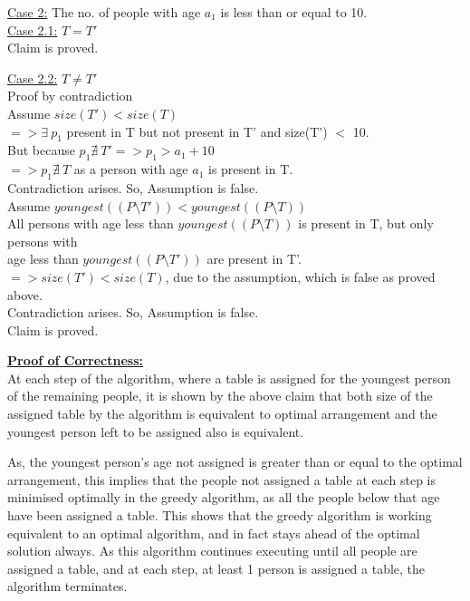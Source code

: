 \documentclass[a4paper]{article}
\begin{document}
\begin{enumerate}[(a)]
    \underline{Case 2:} The no. of people with age $a_1$ is less than or equal to 10.\\
    \phantom{Case 2:} \underline{Case 2.1:} $T = T'$\\
    \phantom{Case 2:Case 2.1:} Claim is proved.
    
    \phantom{Case 2:} \underline{Case 2.2:} $T \not= T'$\\
    \phantom{Case 2:Case 2.1:} Proof by contradiction\\
    
    \phantom{Case 2:Case 2.1:} Assume $size(T') < size(T)$\\
    \phantom{Case 2:Case 2.1:} $=> \exists \ p_1$ present in T but not present in T' and size(T') $<$ 10.\\
    \phantom{Case 2:Case 2.1:} But because $p_1 \nexists \ T' => p_1 > a_1 + 10$\\
    \phantom{Case 2:Case 2.1:} $=> p_1 \nexists \ T$ as a person with age $a_1$ is present in T.\\
    \phantom{Case 2:Case 2.1:} Contradiction arises. So, Assumption is false.\\
    
    \phantom{Case 2:Case 2.1:} Assume $youngest((P \setminus T')) < youngest((P \setminus T))$\\
    \phantom{Case 2:Case 2.1:} All persons with age less than  $youngest((P \setminus T))$ is present in T, but only persons with \\
    \phantom{Case 2:Case 2.1:} age less than $youngest((P \setminus T'))$ are present in T'.\\
    \phantom{Case 2:Case 2.1:} $=> size(T') < size(T)$, due to the assumption, which is false as proved above.\\
    \phantom{Case 2:Case 2.1:} Contradiction arises. So, Assumption is false.\\
    
    \phantom{Case 2:Case 2.1:} Claim is proved. {\hfill\qedsymbol}
    
    \bigskip
    \underline{\textbf{Proof of Correctness:}}\\
    At each step of the algorithm, where a table is assigned for the youngest person of the remaining people, it is shown by the above claim that both size of the assigned table by the algorithm is equivalent to optimal arrangement and the youngest person left to be assigned also is equivalent.
    
    As, the youngest person's age not assigned is greater than or equal to the optimal arrangement, this implies that the people not assigned a table at each step is minimised optimally in the greedy algorithm, as all the people below that age have been assigned a table. This shows that the greedy algorithm is working equivalent to an optimal algorithm, and in fact stays ahead of the optimal solution always. As this algorithm continues executing until all people are assigned a table, and at each step, at least 1 person is assigned a table, the algorithm terminates.\\
    

\end{enumerate}
\end{document}
